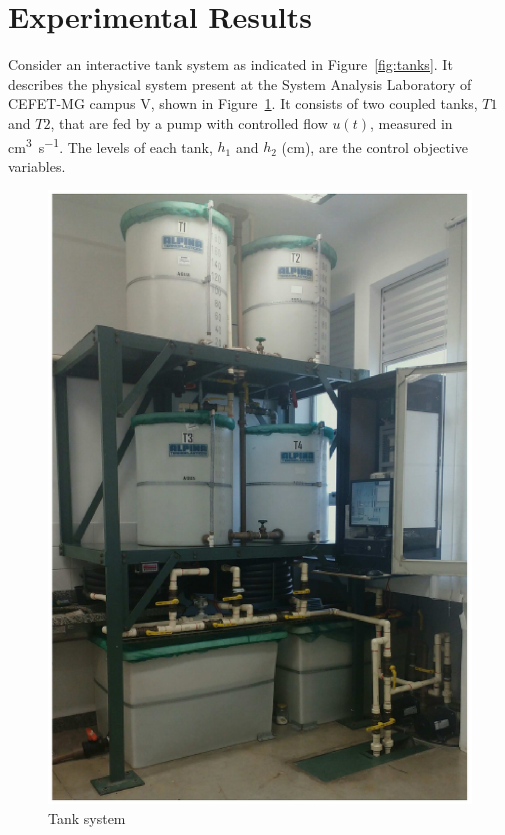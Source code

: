 \section{Experimental Results}%
\label{sec:experimental-results}

Consider an interactive tank system as indicated in Figure~\ref{fig:tanks}. It
describes the physical system present at the System Analysis Laboratory of
CEFET-MG campus V, shown in Figure~\ref{fig:tanks-real}. It consists of two
coupled tanks, \(T1\) and \(T2\), that are fed by a pump with controlled flow
\(u(t)\), measured in \si{\cubic\centi\metre\per\second}. The levels of each
tank, \(h_1\) and \(h_2\) (\si{\centi\metre}), are the control objective
variables.

\begin{figure}[ht!]
	\centering \captionsetup{justification=centering}
	\includegraphics[height=.5\textheight]{imgs/tanks-real}
	\caption{Tank system}%
	\label{fig:tanks-real}
\end{figure}

